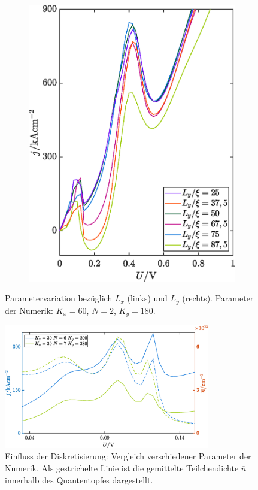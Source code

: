 \begin{figure}
\begin{subfigure}[b]{0.48\textwidth}
        \includegraphics[width=\textwidth]{plots/IV/IV_Ly_variation.eps}
        \label{fig:iv3_2}
    \end{subfigure}
    \caption[]
    {Parametervariation bezüglich $L_x$ (links) und $L_y$ (rechts). Parameter der Numerik: $K_x=60$, $N=2$, $K_y=180$.}
    \label{fig:iv_vergleich1}
\end{figure}

\begin{figure}
  \centering
  \includegraphics[width=0.8\textwidth]{plots/IV/IV_dg_vgl_diskretisierung_wide.eps}
  \caption{Einfluss der Diskretisierung: Vergleich verschiedener Parameter der Numerik. Als gestrichelte Linie ist die gemittelte Teilchendichte $\overline{n}$ innerhalb des Quantentopfes dargestellt.}
  \label{fig:iv4}
\end{figure}

